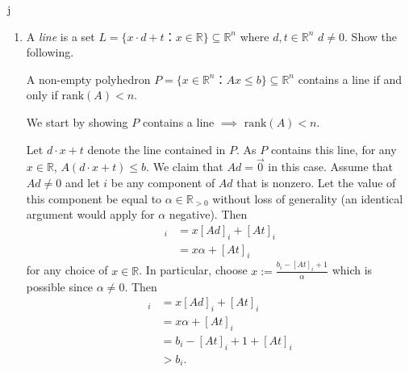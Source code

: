 j\documentclass[11pt]{article}
\newcommand{\setR}{\mathbb{R}}
\renewcommand{\leq}{\leqslant}
\newcommand{\rank}{\mathrm{rank}}
\begin{document}
\begin{enumerate}[1)]

  
  
\item \label{item:10}
  A \emph{line} is a set $L = \{ x ⋅ d +t ： x ∈ ℝ\} ⊆ ℝ^n$ where $d,t ∈ ℝ^n$ $d ≠0$. Show the following.

  A non-empty polyhedron $P = \{ x ∈ ℝ^n ： Ax ≤ b\} ⊆ ℝ^n$ contains a line if  and only if $\rank(A) <n$.
  
  \begin{solution}
  We start by showing $P$ contains a line $\implies$ $\rank(A) < n$. 
  
  Let $d \cdot x + t$ denote the line contained in $P$. As $P$ contains this line, for any $x \in \setR$, $A(d\cdot x +t) \leq b$. We claim that $Ad = \vec{0}$ in this case. Assume that $Ad \neq 0$ and let $i$ be any component of $Ad$ that is nonzero. Let the value of this component be equal to $\alpha \in \setR_{>0}$ without loss of generality (an identical argument would apply for $\alpha$ negative). Then 
  \begin{align*}
  	[A(d\cdot x + t)]_i & = x[Ad]_i + [At]_i \\
	& = x \alpha + [At]_i
  \end{align*}
  for any choice of $x \in \setR$. In particular, choose $x := \frac{b_i - [At]_i+1}{\alpha}$ which is possible since $\alpha \neq 0$. Then 
   \begin{align*}
  	[A(d\cdot x + t)]_i & = x[Ad]_i + [At]_i \\
	& = x \alpha + [At]_i \\
	& = b_i -[At]_i + 1 + [At]_i \\
	& > b_i.
  \end{align*}
  

\end{solution}
\end{enumerate}
\end{document}
